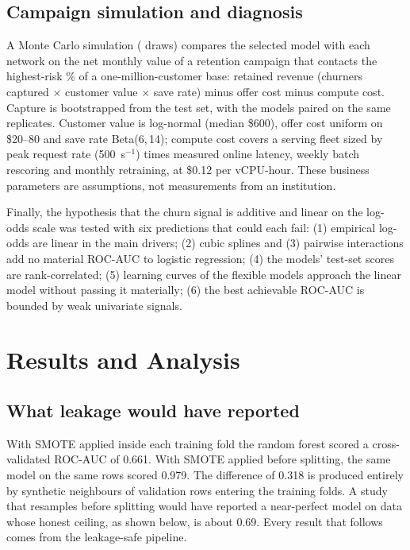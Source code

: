 \documentclass[conference]{IEEEtran}
\begin{document}
\subsection{Campaign simulation and diagnosis}
A Monte Carlo simulation (\McDraws{} draws) compares the selected model with each network on the net monthly value of a retention campaign that contacts the highest-risk \CampaignSharePct\% of a one-million-customer base: retained revenue (churners captured $\times$ customer value $\times$ save rate) minus offer cost minus compute cost. Capture is bootstrapped from the test set, with the models paired on the same replicates. Customer value is log-normal (median \$600), offer cost uniform on \$20--80 and save rate Beta(6,\,14); compute cost covers a serving fleet sized by peak request rate (500~s$^{-1}$) times measured online latency, weekly batch rescoring and monthly retraining, at \$0.12 per vCPU-hour. These business parameters are assumptions, not measurements from an institution.

Finally, the hypothesis that the churn signal is additive and linear on the log-odds scale was tested with six predictions that could each fail: (1) empirical log-odds are linear in the main drivers; (2) cubic splines and (3) pairwise interactions add no material ROC-AUC to logistic regression; (4) the models' test-set scores are rank-correlated; (5) learning curves of the flexible models approach the linear model without passing it materially; (6) the best achievable ROC-AUC is bounded by weak univariate signals.


\section{Results and Analysis}
\subsection{What leakage would have reported}
With SMOTE applied inside each training fold the random forest scored a cross-validated ROC-AUC of 0.661. With SMOTE applied before splitting, the same model on the same rows scored 0.979. The difference of 0.318 is produced entirely by synthetic neighbours of validation rows entering the training folds. A study that resamples before splitting would have reported a near-perfect model on data whose honest ceiling, as shown below, is about 0.69. Every result that follows comes from the leakage-safe pipeline.
\end{document}
